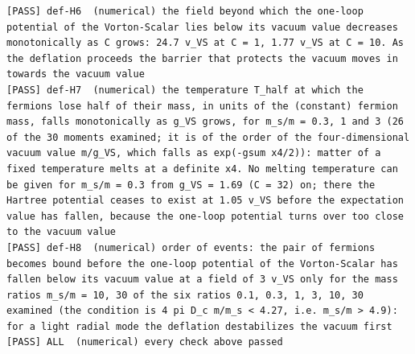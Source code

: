 \documentclass[
  10pt,
]{article}
\begin{document}
\begin{verbatim}
[PASS] def-H6  (numerical) the field beyond which the one-loop potential of the Vorton-Scalar lies below its vacuum value decreases monotonically as C grows: 24.7 v_VS at C = 1, 1.77 v_VS at C = 10. As the deflation proceeds the barrier that protects the vacuum moves in towards the vacuum value
[PASS] def-H7  (numerical) the temperature T_half at which the fermions lose half of their mass, in units of the (constant) fermion mass, falls monotonically as g_VS grows, for m_s/m = 0.3, 1 and 3 (26 of the 30 moments examined; it is of the order of the four-dimensional vacuum value m/g_VS, which falls as exp(-gsum x4/2)): matter of a fixed temperature melts at a definite x4. No melting temperature can be given for m_s/m = 0.3 from g_VS = 1.69 (C = 32) on; there the Hartree potential ceases to exist at 1.05 v_VS before the expectation value has fallen, because the one-loop potential turns over too close to the vacuum value
[PASS] def-H8  (numerical) order of events: the pair of fermions becomes bound before the one-loop potential of the Vorton-Scalar has fallen below its vacuum value at a field of 3 v_VS only for the mass ratios m_s/m = 10, 30 of the six ratios 0.1, 0.3, 1, 3, 10, 30 examined (the condition is 4 pi D_c m/m_s < 4.27, i.e. m_s/m > 4.9): for a light radial mode the deflation destabilizes the vacuum first
[PASS] ALL  (numerical) every check above passed
\end{verbatim}
\end{document}

